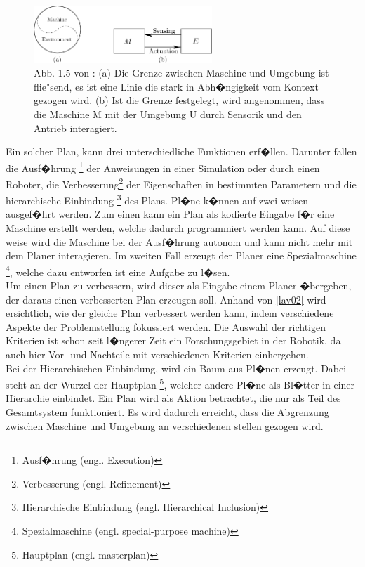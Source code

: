 \begin{figure} %
	\centering
	\includegraphics[width=0.6\textwidth]{images/img224.png}
	\caption{Abb. 1.5 von \cite[~S. 20]{Lav06}:  (a) Die Grenze zwischen Maschine und Umgebung ist flie"send, es ist eine Linie die stark in Abh�ngigkeit vom Kontext gezogen wird. (b) Ist die Grenze festgelegt, wird angenommen, dass die Maschine M mit der Umgebung U durch Sensorik und den Antrieb interagiert.}
	\label{lav01}
\end{figure}
 



Ein solcher Plan, kann drei unterschiedliche Funktionen erf�llen. Darunter fallen die Ausf�hrung \footnote{Ausf�hrung (engl. Execution)} der Anweisungen in einer Simulation oder durch einen Roboter, die Verbesserung\footnote{Verbesserung (engl. Refinement)} der Eigenschaften in bestimmten Parametern und die hierarchische Einbindung \footnote{Hierarchische Einbindung (engl. Hierarchical Inclusion)} des Plans.
Pl�ne k�nnen auf zwei weisen ausgef�hrt werden. Zum einen kann ein Plan als kodierte Eingabe f�r eine Maschine erstellt werden, welche dadurch programmiert werden kann. Auf diese weise wird die Maschine bei der Ausf�hrung autonom und kann nicht mehr mit dem Planer interagieren. 
Im zweiten Fall erzeugt der Planer eine Spezialmaschine \footnote{Spezialmaschine (engl. special-purpose machine)}, welche dazu entworfen ist eine Aufgabe zu l�sen.
\newline\\
Um einen Plan zu verbessern, wird dieser als Eingabe einem Planer �bergeben, der daraus einen verbesserten Plan erzeugen soll. 
Anhand von \ref{lav02} wird ersichtlich, wie der gleiche Plan verbessert werden kann, indem verschiedene Aspekte der Problemstellung fokussiert werden.
Die Auswahl der richtigen Kriterien ist schon seit l�ngerer Zeit ein Forschungsgebiet in der Robotik, da auch hier Vor- und Nachteile mit verschiedenen Kriterien einhergehen.
\newline\\
Bei der Hierarchischen Einbindung, wird ein Baum aus Pl�nen erzeugt. Dabei steht an der Wurzel der Hauptplan \footnote{Hauptplan (engl. masterplan)}, welcher andere Pl�ne als Bl�tter in einer Hierarchie einbindet. Ein Plan wird als Aktion betrachtet, die nur als Teil des Gesamtsystem funktioniert. Es wird dadurch erreicht, dass die Abgrenzung zwischen Maschine und Umgebung an verschiedenen stellen gezogen wird.
\newline\cite[~S. 21ff]{Lav06} 

